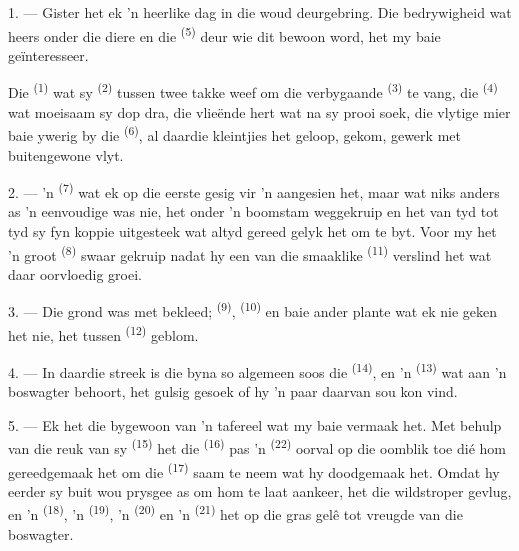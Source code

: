 \VUsaut{3.0mm}

1. --- Gister het ek 'n heerlike dag in die woud deurgebring. Die bedrywigheid wat heers
onder die diere en die  \textsuperscript{(5)} deur wie dit bewoon word,
het my baie geïnteresseer.

Die  \textsuperscript{(1)} wat sy  \textsuperscript{(2)}
tussen twee takke weef om die verbygaande  \textsuperscript{(3)} te vang,
die  \textsuperscript{(4)} wat moeisaam sy dop dra, die vlieënde hert wat na
sy prooi soek, die vlytige mier baie ywerig by die 
\textsuperscript{(6)}, al daardie kleintjies het geloop, gekom, gewerk met buitengewone
vlyt.

2. --- 'n  \textsuperscript{(7)} wat ek op die eerste gesig vir 'n
 aangesien het, maar wat niks anders as 'n eenvoudige 
was nie, het onder 'n boomstam weggekruip en het van tyd tot tyd sy fyn koppie uitgesteek
wat altyd gereed gelyk het om te byt. Voor my het 'n groot 
\textsuperscript{(8)} swaar gekruip nadat hy een van die smaaklike 
\textsuperscript{(11)} verslind het wat daar oorvloedig groei.

3. --- Die grond was met  bekleed; 
\textsuperscript{(9)},  \textsuperscript{(10)} en baie ander plante
wat ek nie geken het nie, het tussen  \textsuperscript{(12)} geblom.

4. --- In daardie streek is die  byna so algemeen soos die
 \textsuperscript{(14)}, en 'n  \textsuperscript{(13)}
wat aan 'n boswagter behoort, het gulsig gesoek of hy 'n paar daarvan sou kon vind.

\VUsaut{3.0mm}
\VUsaut{3.0mm}

5. --- Ek het die  bygewoon van 'n tafereel wat my baie vermaak het. Met
behulp van die reuk van sy  \textsuperscript{(15)} het die
 \textsuperscript{(16)} pas 'n 
\textsuperscript{(22)} oorval op die oomblik toe dié hom gereedgemaak het om die
 \textsuperscript{(17)} saam te neem wat hy doodgemaak het. Omdat hy eerder
sy buit wou prysgee as om hom te laat aankeer, het die wildstroper gevlug, en 'n
 \textsuperscript{(18)}, 'n  \textsuperscript{(19)}, 'n
 \textsuperscript{(20)} en 'n  \textsuperscript{(21)} het op
die gras gelê tot vreugde van die boswagter.

